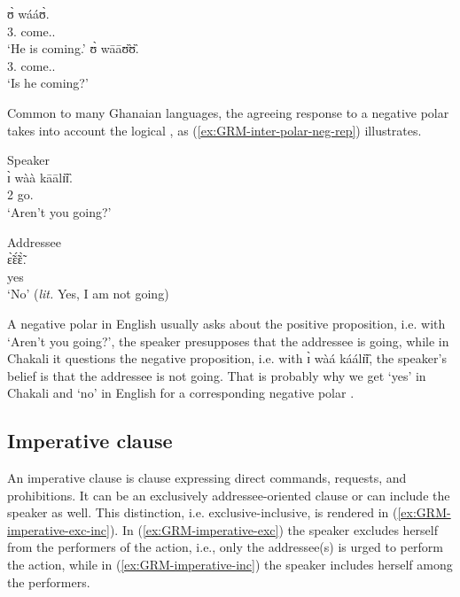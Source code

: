 \begin{multicols}{2}
\ea
\gll ʊ̀ wááʊ̀.\\
{3.\sg} come.{\ipfv .\foc}\\
\glt  `He is coming.'
\ex 
\gll ʊ̀ wāāʊ̏ʊ̏.\\
{3.\sg} come.{\ipfv .\q}\\
\glt `Is he coming?'%

\z 
\end{multicols}
 \z
 
Common to many Ghanaian languages, the  agreeing response to a  negative polar  takes into account the logical , as (\ref{ex:GRM-inter-polar-neg-rep}) illustrates. 

\ea\label{ex:GRM-inter-polar-neg-rep}
\ea\label{ex:GRM-inter-polar-neg-rep-S}{\rm Speaker}\\
\gll  ɪ̀ wàà kāālɪ̏ɪ̏.\\
{2\sg} {\neg} go.{\q}\\
\glt `Aren't you going?'

\ex\label{ex:GRM-inter-polar-neg-rep-A}{\rm Addressee}\\
\gll ɛ̃̀ɛ̃́ɛ̃̀.\\
yes\\
\glt `No' ({\it lit.} Yes, I am not going)

\z 
 \z
 
A negative polar  in English usually asks about the positive proposition, i.e. with `Aren't you going?',  the speaker presupposes that the addressee is going,   while in Chakali it questions the negative proposition, i.e. with {\sls  ɪ̀ wàá káálɪ̏ɪ̏},  the speaker's belief is that the addressee is not going. That is probably why we get `yes' in Chakali and `no' in English for a corresponding negative polar .

\subsection{Imperative clause}
\label{sec:GRM-imper-clause}

An imperative clause is clause expressing direct commands, requests, and prohibitions. It can be an exclusively addressee-oriented clause or  can include the speaker as well. This distinction, i.e. exclusive-inclusive, is rendered in  (\ref{ex:GRM-imperative-exc-inc}). In (\ref{ex:GRM-imperative-exc}) the  speaker excludes herself  from the performers of the action, i.e., only the addressee(s) is urged to perform the action,  while in  (\ref{ex:GRM-imperative-inc}) the speaker includes herself among the performers.



